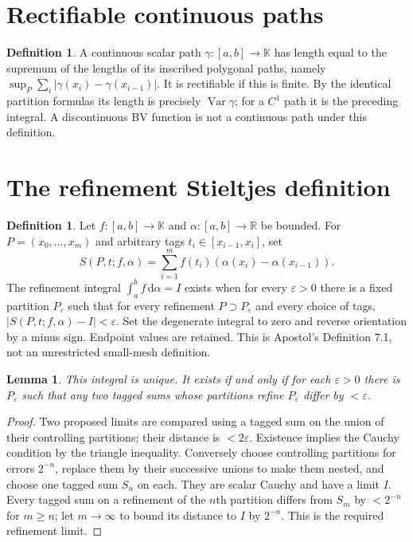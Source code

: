 \documentclass[11pt,oneside,a4paper]{book}
\newtheorem{lemma}[theorem]{Lemma}
\theoremstyle{definition}
\newtheorem{definition}[theorem]{Definition}
\theoremstyle{remark}
\newcommand{\R}{\mathbb R}
\newcommand{\K}{\mathbb K}
\newcommand{\eps}{\varepsilon}
\newcommand{\abs}[1]{\lvert#1\rvert}
\newcommand{\dd}{\,\mathrm d}
\DeclareMathOperator{\Var}{Var}
\newcommand{\KEntry}[2]{\Needspace{7\baselineskip}\section{#2}\label{#1}{\small\sffamily\color{black!60}\detokenize{#1}}\par}
\begin{document}
\KEntry{K03.15.rectifiable}{Rectifiable continuous paths}
\begin{definition}
A continuous scalar path $\gamma:[a,b]\to\K$ has length equal to the supremum of the lengths of its inscribed polygonal paths, namely $\sup_P\sum_i\abs{\gamma(x_i)-\gamma(x_{i-1})}$. It is rectifiable if this is finite. By the identical partition formulas its length is precisely $\Var\gamma$; for a $C^1$ path it is the preceding integral. A discontinuous BV function is not a continuous path under this definition.
\end{definition}

\KEntry{K03.15.rs_sums}{The refinement Stieltjes definition}
\begin{definition}
Let $f:[a,b]\to\K$ and $\alpha:[a,b]\to\R$ be bounded. For $P=(x_0,\ldots,x_m)$ and arbitrary tags $t_i\in[x_{i-1},x_i]$, set
\[S(P,t;f,\alpha)=\sum_{i=1}^mf(t_i)(\alpha(x_i)-\alpha(x_{i-1})).\]
The refinement integral $\int_a^b f\dd\alpha=I$ exists when for every $\eps>0$ there is a fixed partition $P_\eps$ such that for every refinement $P\supset P_\eps$ and every choice of tags, $\abs{S(P,t;f,\alpha)-I}<\eps$. Set the degenerate integral to zero and reverse orientation by a minus sign. Endpoint values are retained. This is Apostol's Definition 7.1, not an unrestricted small-mesh definition.
\end{definition}
\begin{lemma}
This integral is unique. It exists if and only if for each $\eps>0$ there is $P_\eps$ such that any two tagged sums whose partitions refine $P_\eps$ differ by $<\eps$.
\end{lemma}
\begin{proof}
Two proposed limits are compared using a tagged sum on the union of their controlling partitions; their distance is $<2\eps$. Existence implies the Cauchy condition by the triangle inequality. Conversely choose controlling partitions for errors $2^{-n}$, replace them by their successive unions to make them nested, and choose one tagged sum $S_n$ on each. They are scalar Cauchy and have a limit $I$. Every tagged sum on a refinement of the $n$th partition differs from $S_m$ by $<2^{-n}$ for $m\geq n$; let $m\to\infty$ to bound its distance to $I$ by $2^{-n}$. This is the required refinement limit.
\end{proof}
\end{document}
